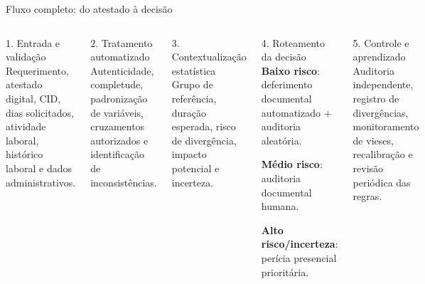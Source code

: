 \documentclass[presentation,aspectratio=169]{beamer}
\begin{document}
\begin{frame}[t]{Fluxo completo: do atestado à decisão}
\begin{columns}[T,onlytextwidth]
\begin{block}{1. Entrada e validação}\small
Requerimento, atestado digital, CID, dias solicitados, atividade laboral, histórico laboral e dados administrativos.
\end{block}
\begin{block}{2. Tratamento automatizado}\small
Autenticidade, completude, padronização de variáveis, cruzamentos autorizados e identificação de inconsistências.
\end{block}
\begin{block}{3. Contextualização estatística}\small
Grupo de referência, duração esperada, risco de divergência, impacto potencial e incerteza.
\end{block}
\begin{block}{4. Roteamento da decisão}\small
\textbf{Baixo risco}: deferimento documental automatizado + auditoria aleatória.\par\vspace{0.25em}
\textbf{Médio risco}: auditoria documental humana.\par\vspace{0.25em}
\textbf{Alto risco/incerteza}: perícia presencial prioritária.
\end{block}
\begin{block}{5. Controle e aprendizado}\small
Auditoria independente, registro de divergências, monitoramento de vieses, recalibração e revisão periódica das regras.
\end{block}
\end{columns}
\end{frame}
\end{document}
